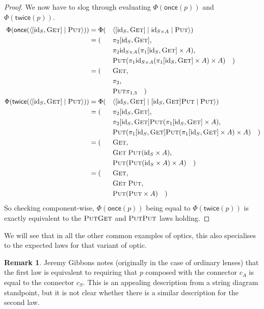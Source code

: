 \documentclass[11pt,letterpaper]{article}
\theoremstyle{plain}
\theoremstyle{definition}
\newtheorem{remark}[theorem]{Remark}
\newcommand{\Optic}{\mathbf{Optic}}
\newcommand{\id}{\mathrm{id}}
\newcommand{\rep}[2]{{\ensuremath \left\langle #1 \mid #2 \right\rangle}}
\newcommand{\repthree}[3]{{\ensuremath \langle #1 \mid #2 \mid #3 \rangle}}
\newcommand{\fget}{\textsc{Get}}
\newcommand{\fput}{\textsc{Put}}
\newcommand{\once}{\mathsf{once}}
\newcommand{\twice}{\mathsf{twice}}
\newcommand{\todo}[1]{\textcolor{red}{\small #1}}
\begin{document}
\begin{proof}
  We now have to slog through evaluating $\Phi(\once(p))$ and $\Phi(\twice(p))$.
  \begin{alignat*}{3}
    \Phi(\once(\rep{[\id_S, \fget]}{\fput})) &=
    \Phi(&&\repthree{[\id_S, \fget]}{\id_{S \times A}}{\fput}) \\
    &= (&&\pi_2 [\id_S, \fget], \\
    &&&\pi_2 \id_{S \times A} (\pi_1 [\id_S, \fget] \times A), \\
    &&& \fput (\pi_1 \id_{S \times A} (\pi_1 [\id_S, \fget] \times A) \times A) \quad) \\
    &= (&&\fget, \\
    &&& \pi_2, \\
    &&& \fput \pi_{1,3} \quad) \\
    \Phi(\twice(\rep{[\id_S, \fget]}{\fput})) &=
    \Phi(&&\repthree{[\id_S, \fget]}{[\id_S, \fget]\fput}{\fput}) \\
    &= (&&\pi_2 [\id_S, \fget], \\
    &&&\pi_2 [\id_S, \fget]\fput (\pi_1 [\id_S, \fget] \times A), \\
    &&& \fput (\pi_1 [\id_S, \fget]\fput (\pi_1 [\id_S, \fget] \times A) \times A) \quad) \\
    &= (&&\fget, \\
    &&& \fget \; \fput (\id_S \times A), \\
    &&& \fput (\fput (\id_S \times A) \times A) \quad) \\
    &= (&&\fget, \\
    &&& \fget \; \fput, \\
    &&& \fput (\fput \times A) \quad)
  \end{alignat*}
  So checking component-wise, $\Phi(\once(p))$ being equal to $\Phi(\twice(p))$ is exactly equivalent to the $\fput\fget$ and $\fput\fput$ laws holding.
\end{proof}

We will see that in all the other common examples of optics, this also specialises to the expected laws for that variant of optic.

\begin{remark}
  Jeremy Gibbons notes (originally in the case of ordinary lenses) that the first law is equivalent to requiring that $p$ composed with the connector $c_A$ is equal to the connector $c_S$. This is an appealing description from a string diagram standpoint, but it is not clear whether there is a similar description for the second law. %
\end{remark}
\end{document}
